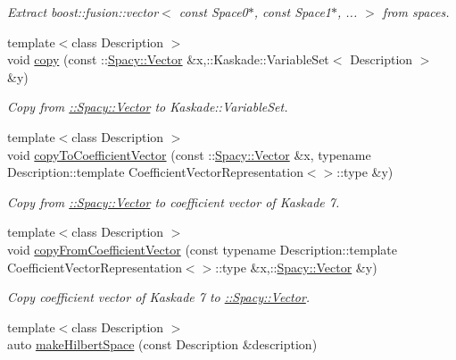 \begin{DoxyCompactItemize}
\begin{DoxyCompactList}\small\item\em Extract boost\+::fusion\+::vector$<$ const Space0$\ast$, const Space1$\ast$, ... $>$ from spaces. \end{DoxyCompactList}\item 
{\footnotesize template$<$class Description $>$ }\\void \hyperlink{group__KaskadeGroup_gafbbd7e385eda54f651c45b1c074d7bf9_gafbbd7e385eda54f651c45b1c074d7bf9}{copy} (const \+::\hyperlink{classSpacy_1_1Vector}{Spacy\+::\+Vector} \&x,\+::Kaskade\+::\+Variable\+Set$<$ Description $>$ \&y)
\begin{DoxyCompactList}\small\item\em Copy from \hyperlink{group__SpacyGroup_gafc144d2730ef87a67e54f8cd750b1f54_VectorAnchor}{\+:\+:Spacy\+:\+:Vector} to Kaskade\+::\+Variable\+Set. \end{DoxyCompactList}\item 
{\footnotesize template$<$class Description $>$ }\\void \hyperlink{group__KaskadeGroup_ga4d7422b0c155f9622e54b9d3503d82d8_ga4d7422b0c155f9622e54b9d3503d82d8}{copy\+To\+Coefficient\+Vector} (const \+::\hyperlink{classSpacy_1_1Vector}{Spacy\+::\+Vector} \&x, typename Description\+::template Coefficient\+Vector\+Representation$<$$>$\+::type \&y)
\begin{DoxyCompactList}\small\item\em Copy from \hyperlink{group__SpacyGroup_gafc144d2730ef87a67e54f8cd750b1f54_VectorAnchor}{\+:\+:Spacy\+:\+:Vector} to coefficient vector of Kaskade 7. \end{DoxyCompactList}\item 
{\footnotesize template$<$class Description $>$ }\\void \hyperlink{group__KaskadeGroup_ga75249db31f75e23a474c4a9a5b792d67_ga75249db31f75e23a474c4a9a5b792d67}{copy\+From\+Coefficient\+Vector} (const typename Description\+::template Coefficient\+Vector\+Representation$<$$>$\+::type \&x,\+::\hyperlink{classSpacy_1_1Vector}{Spacy\+::\+Vector} \&y)
\begin{DoxyCompactList}\small\item\em Copy coefficient vector of Kaskade 7 to \hyperlink{group__SpacyGroup_gafc144d2730ef87a67e54f8cd750b1f54_VectorAnchor}{\+:\+:Spacy\+:\+:Vector}. \end{DoxyCompactList}\item 
{\footnotesize template$<$class Description $>$ }\\auto \hyperlink{group__KaskadeGroup_ga04d45446864bbf87770d02eade7b64cf_ga04d45446864bbf87770d02eade7b64cf}{make\+Hilbert\+Space} (const Description \&description)

\end{DoxyCompactItemize}
